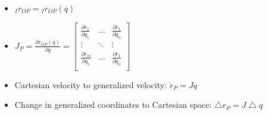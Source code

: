 \begin{itemize}
\begin{itemize}
            \item ${}_I r_{OP} = {}_I r_{OP}(q)$
        \end{itemize}
        \begin{itemize}
            \item $J_P = \frac{\partial r_{OP}(q)}{\partial q} =
                \begin{bmatrix}
                    \frac{\partial r_1}{\partial q_1} & \dots & \frac{\partial r_1}{\partial q_n}\\
                    \vdots & \ddots & \vdots\\
                    \frac{\partial r_m}{\partial q_1} & \dots & \frac{\partial r_1}{\partial q_n}\\
                \end{bmatrix}$
            \item Cartesian velocity to generalized velocity: $\dot r_P = J \dot q$
            \item Change in generalized coordinates to Cartesian space: $\bigtriangleup r_P = J \bigtriangleup q$
        \end{itemize}
\end{itemize}

